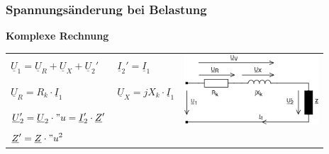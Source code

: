 		\subsubsection{Spannungs\"anderung bei Belastung}
		\textbf{Komplexe Rechnung}\\
			\begin{tabular}{p{5cm}p{5cm}p{6cm}}
	            		$\boxed{\underline{U}_1 =
	            		\underline{U}_R+\underline{U}_X+\underline{U}_2'}$ & 
	            		$\boxed{\underline{I}_2' = \underline{I}_1}$ &
	            		\multirow{3}{*}{
	            		\parbox{6cm}{\includegraphics[width=5cm]{bilder/ErsatzschaltbildTrafoLast.png}}}
	            			            	\\		
	            		$\underline{U}_R=R_k \cdot \underline{I}_1$ &
	            		$\underline{U}_X=jX_k \cdot \underline{I}_1$ \\
	            		$\underline{U}_2'=\underline{U}_2 \cdot "u = \underline{I}_2' \cdot \underline{Z}'  $\\
	            		$\underline{Z}' = \underline{Z} \cdot {"u}^2$ \\
            \end{tabular}\\
		\renewcommand{\arraystretch}{1.0}

